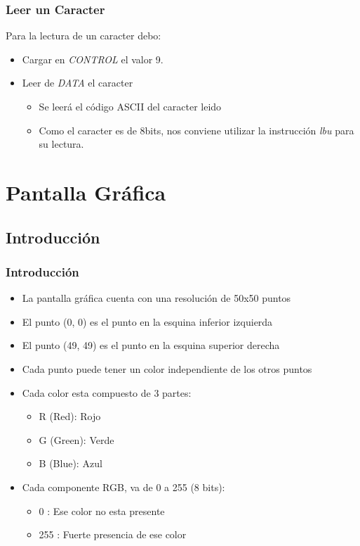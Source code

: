 \documentclass{beamer}
\begin{document}
\begin{frame}
\frametitle{Leer un Caracter}

Para la lectura de un caracter debo:
\begin{itemize}
\item Cargar en \emph{CONTROL} el valor 9.
\item Leer de \emph{DATA} el caracter
\begin{itemize}
\item Se leerá el código ASCII del caracter leido
\item Como el caracter es de 8bits, nos conviene utilizar la instrucción \emph{lbu} para su lectura.
\end{itemize}
\end{itemize}

\end{frame}
	

\section{Pantalla Gráfica}
\subsection{Introducción}

\begin{frame}
\frametitle{Introducción}

\begin{itemize}
\item La pantalla gráfica cuenta con una resolución de 50x50 puntos
\item El punto (0, 0) es el punto en la esquina inferior izquierda
\item El punto (49, 49) es el punto en la esquina superior derecha
\item Cada punto puede tener un color independiente de los otros puntos
\item Cada color esta compuesto de 3 partes:

\begin{itemize}
\item R (Red): Rojo 
\item G (Green): Verde
\item B (Blue): Azul
\end{itemize}

\item Cada componente RGB, va de 0 a 255 (8 bits):
\begin{itemize}
\item 0 : Ese color no esta presente
\item 255 : Fuerte presencia de ese color
\end{itemize}

\end{itemize}
\end{frame}
\end{document}
